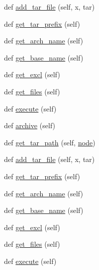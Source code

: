 \begin{DoxyCompactItemize}
\item 
def \hyperlink{classwaflib_1_1_scripting_1_1_dist_a2afba826ee8f5b522e6ce822f9878755}{add\+\_\+tar\+\_\+file} (self, x, tar)
\item 
def \hyperlink{classwaflib_1_1_scripting_1_1_dist_a20b28677d28b516c05e8af1b20c65c67}{get\+\_\+tar\+\_\+prefix} (self)
\item 
def \hyperlink{classwaflib_1_1_scripting_1_1_dist_a98d05f8f6a2fc8f33814fbc654135724}{get\+\_\+arch\+\_\+name} (self)
\item 
def \hyperlink{classwaflib_1_1_scripting_1_1_dist_aba6bf457f948f8ac80d1de9f47a59ac2}{get\+\_\+base\+\_\+name} (self)
\item 
def \hyperlink{classwaflib_1_1_scripting_1_1_dist_a1280a2469cad7d9fa88c3afcbbfa920d}{get\+\_\+excl} (self)
\item 
def \hyperlink{classwaflib_1_1_scripting_1_1_dist_afe6d98e6e39822f250f9302b07c0afab}{get\+\_\+files} (self)
\item 
def \hyperlink{classwaflib_1_1_scripting_1_1_dist_a1ed5e146ed66af4d02c205dbb428f49f}{execute} (self)
\item 
def \hyperlink{classwaflib_1_1_scripting_1_1_dist_aaaa979f347096bd91a2feb553bbacf35}{archive} (self)
\item 
def \hyperlink{classwaflib_1_1_scripting_1_1_dist_a64707e5623688ede0aa955afe3640b98}{get\+\_\+tar\+\_\+path} (self, \hyperlink{structnode}{node})
\item 
def \hyperlink{classwaflib_1_1_scripting_1_1_dist_a2afba826ee8f5b522e6ce822f9878755}{add\+\_\+tar\+\_\+file} (self, x, tar)
\item 
def \hyperlink{classwaflib_1_1_scripting_1_1_dist_a20b28677d28b516c05e8af1b20c65c67}{get\+\_\+tar\+\_\+prefix} (self)
\item 
def \hyperlink{classwaflib_1_1_scripting_1_1_dist_a98d05f8f6a2fc8f33814fbc654135724}{get\+\_\+arch\+\_\+name} (self)
\item 
def \hyperlink{classwaflib_1_1_scripting_1_1_dist_aba6bf457f948f8ac80d1de9f47a59ac2}{get\+\_\+base\+\_\+name} (self)
\item 
def \hyperlink{classwaflib_1_1_scripting_1_1_dist_a1280a2469cad7d9fa88c3afcbbfa920d}{get\+\_\+excl} (self)
\item 
def \hyperlink{classwaflib_1_1_scripting_1_1_dist_afe6d98e6e39822f250f9302b07c0afab}{get\+\_\+files} (self)
\item 
def \hyperlink{classwaflib_1_1_scripting_1_1_dist_a1ed5e146ed66af4d02c205dbb428f49f}{execute} (self)
\item 

\end{DoxyCompactItemize}
